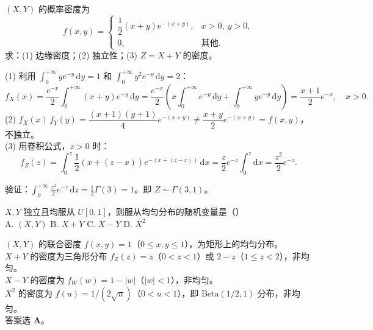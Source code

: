 \documentclass[lang=cn,11pt]{elegantbook}
\begin{document}
\begin{exercise}[Gamma型联合密度] \label{exer:3-c9b}
$(X,Y)$ 的概率密度为
\[
f(x,y) = \begin{cases} \dfrac{1}{2}(x+y)e^{-(x+y)}, & x>0,\ y>0, \\ 0, & \text{其他}. \end{cases}
\]
求：(1) 边缘密度；(2) 独立性；(3) $Z=X+Y$ 的密度。
\end{exercise}
\begin{solution}
(1) 利用 $\displaystyle\int_0^{+\infty}ye^{-y}\,\mathrm{d}y = 1$ 和 $\displaystyle\int_0^{+\infty}y^2 e^{-y}\,\mathrm{d}y = 2$：
\[
f_X(x) = \frac{e^{-x}}{2}\int_0^{+\infty}(x+y)e^{-y}\,\mathrm{d}y = \frac{e^{-x}}{2}\left(x\int_0^{+\infty}e^{-y}\,\mathrm{d}y+\int_0^{+\infty}ye^{-y}\,\mathrm{d}y\right) = \frac{x+1}{2}e^{-x},\quad x>0.
\]
(2) $f_X(x)\,f_Y(y) = \dfrac{(x+1)(y+1)}{4}e^{-(x+y)} \neq \dfrac{x+y}{2}e^{-(x+y)} = f(x,y)$，不独立。\\
(3) 用卷积公式，$z>0$ 时：
\[
f_Z(z) = \int_0^z\frac{1}{2}(x+(z-x))e^{-(x+(z-x))}\,\mathrm{d}x = \frac{z}{2}e^{-z}\int_0^z\mathrm{d}x = \frac{z^2}{2}e^{-z}.
\]
\begin{note}
验证：$\displaystyle\int_0^{+\infty}\frac{z^2}{2}e^{-z}\,\mathrm{d}z = \frac{1}{2}\Gamma(3) = 1$。即 $Z \sim \Gamma(3,1)$。
\end{note}
\end{solution}



\begin{exercise}[联合均匀分布的判断] \label{exer:3-c12b}
$X,Y$ 独立且均服从 $U[0,1]$，则服从均匀分布的随机变量是（\quad）\\
A. $(X,Y)$ \quad B. $X+Y$ \quad C. $X-Y$ \quad D. $X^2$
\end{exercise}
\begin{solution}
$(X,Y)$ 的联合密度 $f(x,y)=1$（$0\leqslant x,y\leqslant 1$），为矩形上的均匀分布。\\
$X+Y$ 的密度为三角形分布 $f_Z(z) = z$（$0<z<1$）或 $2-z$（$1\leqslant z<2$），非均匀。\\
$X-Y$ 的密度为 $f_W(w) = 1-|w|$（$|w|<1$），非均匀。\\
$X^2$ 的密度为 $f(u) = 1/(2\sqrt{u})$（$0<u<1$），即 $\text{Beta}(1/2,1)$ 分布，非均匀。\\
答案选 \textbf{A}。
\end{solution}
\end{document}

